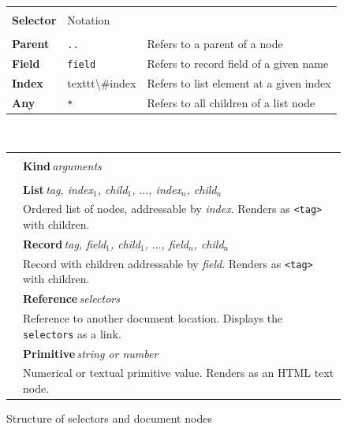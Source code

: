 \documentclass[sigconf]{acmart}
\begin{document}
\begin{figure}
\newcommand{\seltablecol}[3]{
\sffamily\small{\bfseries #2} & {\footnotesize #1} & \footnotesize #3\\
}
\newcommand{\ndtablecol}[4]{
\raisebox{-0.2em}{#1} & \sffamily\small{\bfseries #2}\,\;\textit{\footnotesize #3}\\[-0.2em]
&\sffamily\footnotesize #4\\[0.3em]
}

\begin{tabular}{|llp{18.08em}|}
\hline
\rowcolor{ekgray}
&&\\[-1em]
\rowcolor{ekgray}
\sffamily\small{\bfseries Selector} & {\sffamily\footnotesize Notation} & \\[0.2em]
\hline
&&\\[-1em]
\seltablecol{\texttt{..}}{Parent}{Refers to a parent of a node}
\seltablecol{\texttt{field}}{Field}{Refers to record field of a given name}
\seltablecol{texttt{\textbackslash\#index}}{Index}{Refers to list element at a given index}
\seltablecol{\texttt{*}}{Any}{Refers to all children of a list node}
\hline
\end{tabular}

~\\[0.5em]

\begin{tabular}{|cl|}
\hline
\rowcolor{ekgray}
&\\[-1em]
\rowcolor{ekgray}
& \sffamily\small{\bfseries Kind}\;\,\textit{\footnotesize arguments} \\[0.2em]
\hline
&\\[-1em]
\ndtablecol{\faListUl}{List}{tag, index$_1$, child$_1$, $\ldots$, index$_n$, child$_n$}
  {Ordered list of nodes, addressable by \textit{index}. Renders as \texttt{<tag>} with children.}
\ndtablecol{\faFileO}{Record}{tag, field$_1$, child$_1$, $\ldots$, field$_n$, child$_n$}
  {Record with children addressable by \textit{field}. Renders as \texttt{<tag>} with children.}
\ndtablecol{\faExternalLink}{Reference}{selectors}
  {Reference to another document location. Displays the \texttt{selectors} as a link.}
\ndtablecol{\faFont}{Primitive}{string \textnormal{or} number}
  {Numerical or textual primitive value. Renders as an HTML text node.}
\hline
\end{tabular}
\caption{Structure of selectors and document nodes}
\label{fig:doc}
\end{figure}

\end{document}
